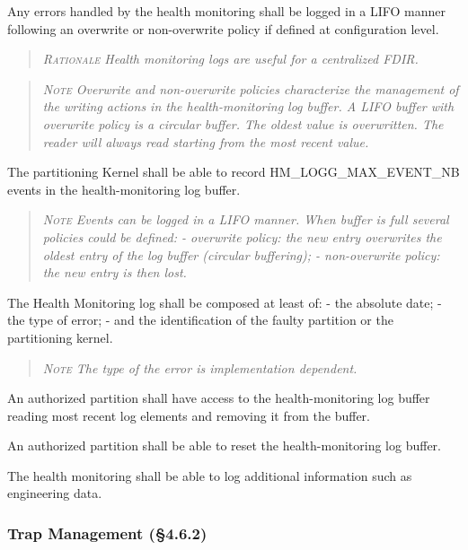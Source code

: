 Any errors handled by the health monitoring shall be logged in a LIFO manner following an overwrite or non-overwrite policy if defined at configuration level.
\begin{quote}\it
\textsc{Rationale}
Health monitoring logs are useful for a centralized FDIR.
\end{quote}
\begin{quote}\it
\textsc{Note}
Overwrite and non-overwrite policies characterize the management of the writing actions in the health-monitoring log buffer. A LIFO buffer with overwrite policy is a circular buffer. The oldest value is overwritten. The reader will always read starting from the most recent value.
\end{quote}

The partitioning Kernel shall be able to record HM\_LOGG\_MAX\_EVENT\_NB events in the health-monitoring log buffer.
\begin{quote}\it
\textsc{Note}
Events can be logged in a LIFO manner. When buffer is full several policies could be defined:
- overwrite policy: the new entry overwrites the oldest entry of the log buffer (circular buffering);
- non-overwrite policy: the new entry is then lost.
\end{quote}

The Health Monitoring log shall be composed at least of:
- the absolute date;
- the type of error;
- and the identification of the faulty partition or the partitioning kernel.
\begin{quote}\it
\textsc{Note}
The type of the error is implementation dependent.
\end{quote}

An authorized partition shall have access to the health-monitoring log buffer reading most recent log elements and removing it from the buffer.

An authorized partition shall be able to reset the health-monitoring log buffer.

The health monitoring shall be able to log additional information such as engineering data.

\subsubsection{Trap Management (\S4.6.2)}

